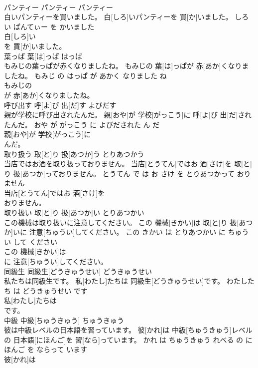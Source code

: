 \documentclass[8pt]{extreport}
\begin{document}
\begin{CJK}{UTF8}{min}
\\	パンティー	パンティー	パンティー	
\\	白いパンティーを買いました。	白[しろ]いパンティーを 買[か]いました。	しろい ぱんてぃー を かいました	
\\	白[しろ]い
\\	を 買[か]いました。			
\\	葉っぱ	葉[は]っぱ	はっぱ	
\\	もみじの葉っぱが赤くなりましたね。	もみじの 葉[は]っぱが 赤[あか]くなりましたね。	もみじ の はっぱ が あかく なりました ね	
\\	もみじの
\\	が 赤[あか]くなりましたね。			
\\	呼び出す	呼[よ]び 出[だ]す	よびだす	
\\	親が学校に呼び出されたんだ。	親[おや]が 学校[がっこう]に 呼[よ]び 出[だ]されたんだ。	おや が がっこう に よびだされた ん だ	
\\	親[おや]が 学校[がっこう]に
\\	んだ。			
\\	取り扱う	取[と]り 扱[あつか]う	とりあつかう	
\\	当店ではお酒を取り扱っておりません。	当店[とうてん]ではお 酒[さけ]を 取[と]り 扱[あつか]っておりません。	とうてん で は お さけ を とりあつかって おりません	
\\	当店[とうてん]ではお 酒[さけ]を
\\	おりません。			
\\	取り扱い	取[と]り 扱[あつか]い	とりあつかい	
\\	この機械は取り扱いに注意してください。	この 機械[きかい]は 取[と]り 扱[あつか]いに 注意[ちゅうい]してください。	この きかい は とりあつかい に ちゅうい して ください	
\\	この 機械[きかい]は
\\	に 注意[ちゅうい]してください。			
\\	同級生	同級生[どうきゅうせい]	どうきゅうせい	
\\	私たちは同級生です。	私[わたし]たちは 同級生[どうきゅうせい]です。	わたしたち は どうきゅうせい です	
\\	私[わたし]たちは
\\	です。			
\\	中級	中級[ちゅうきゅう]	ちゅうきゅう	
\\	彼は中級レベルの日本語を習っています。	彼[かれ]は 中級[ちゅうきゅう]レベルの 日本語[にほんご]を 習[なら]っています。	かれ は ちゅうきゅう れべる の にほんご を ならって います	
\\	彼[かれ]は

\end{CJK}
\end{document}
